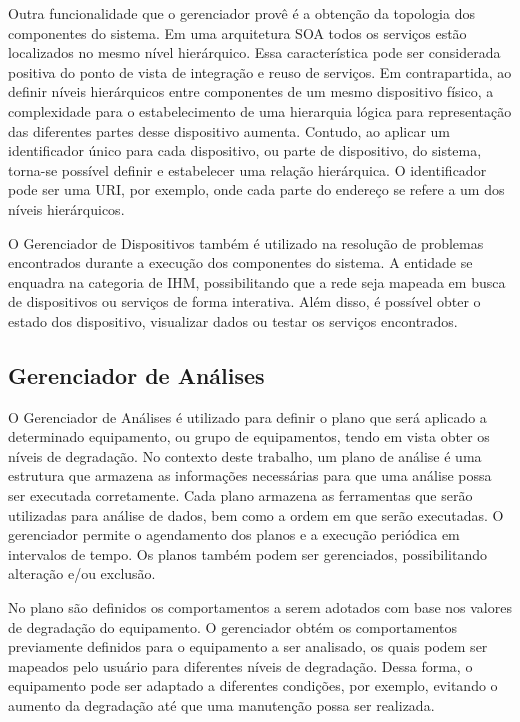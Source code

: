 Outra funcionalidade que o gerenciador provê é a obtenção da topologia dos componentes do sistema.
Em uma arquitetura \gls{SOA} todos os serviços estão localizados no mesmo nível hierárquico. Essa
característica pode ser considerada positiva do ponto de vista de integração e reuso de serviços. Em
contrapartida, ao definir níveis hierárquicos entre componentes de um mesmo dispositivo físico, a
complexidade para o estabelecimento de uma hierarquia lógica para representação das diferentes
partes desse dispositivo aumenta. Contudo, ao aplicar um identificador único para cada dispositivo,
ou parte de dispositivo, do sistema, torna-se possível definir e estabelecer uma relação
hierárquica. O identificador pode ser uma \gls{URI}, por exemplo, onde cada parte do endereço se
refere a um dos níveis hierárquicos.

O Gerenciador de Dispositivos também é utilizado na resolução de problemas encontrados durante a
execução dos componentes do sistema. A entidade se enquadra na categoria de \gls{IHM},
possibilitando que a rede seja mapeada em busca de dispositivos ou serviços de forma interativa.
Além disso, é possível obter o estado dos dispositivo, visualizar dados ou testar os serviços
encontrados.


\subsection{Gerenciador de Análises}
\label{sub:proposta-gerenciador-analises}

O Gerenciador de Análises é utilizado para definir o plano que será aplicado a determinado
equipamento, ou grupo de equipamentos, tendo em vista obter os níveis de degradação. No contexto
deste trabalho, um plano de análise é uma estrutura que armazena as informações necessárias para que
uma análise possa ser executada corretamente. Cada plano armazena as ferramentas que serão
utilizadas para análise de dados, bem como a ordem em que serão executadas. O gerenciador permite o
agendamento dos planos e a execução periódica em intervalos de tempo. Os planos também podem ser
gerenciados, possibilitando alteração e/ou exclusão.

No plano são definidos os comportamentos a serem adotados com base nos valores de degradação do
equipamento. O gerenciador obtém os comportamentos previamente definidos para o equipamento a ser
analisado, os quais podem ser mapeados pelo usuário para diferentes níveis de degradação. Dessa
forma, o equipamento pode ser adaptado a diferentes condições, por exemplo, evitando o aumento da
degradação até que uma manutenção possa ser realizada.

